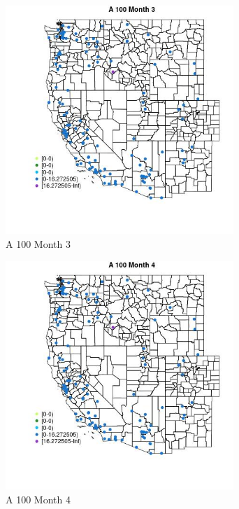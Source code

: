 \begin{figure} 
\centering  
\includegraphics[width=0.77\textwidth]{Code_Outputs/Report_ML_input_PM25_Step4_part_e_de_duplicated_aves_MapObsMo3A_100.jpg} 
\caption{\label{fig:Report_ML_input_PM25_Step4_part_e_de_duplicated_avesMapObsMo3A_100}A 100 Month 3} 
\end{figure} 
 

\begin{figure} 
\centering  
\includegraphics[width=0.77\textwidth]{Code_Outputs/Report_ML_input_PM25_Step4_part_e_de_duplicated_aves_MapObsMo4A_100.jpg} 
\caption{\label{fig:Report_ML_input_PM25_Step4_part_e_de_duplicated_avesMapObsMo4A_100}A 100 Month 4} 
\end{figure} 
 

